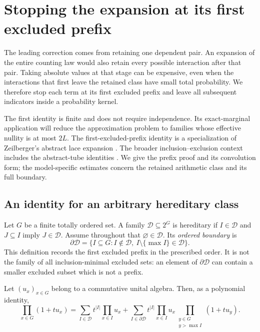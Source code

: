 \section{Stopping the expansion at its first excluded prefix}
\label{p1:stop:section}

The leading correction comes from retaining one dependent pair.
An expansion of the entire counting law would also retain every
possible interaction after that pair.  Taking absolute values at
that stage can be expensive, even when the interactions that first
leave the retained class have small total probability.  We therefore
stop each term at its first excluded prefix and leave all subsequent
indicators inside a probability kernel.

The first identity is finite and does not require independence.
Its exact-marginal application will reduce the approximation problem to
families whose effective nullity is at most $2L$.
The first-excluded-prefix identity is a specialization of
Zeilberger's abstract lace expansion
\cite[formula~(*)]{zeilberger1997}. The broader inclusion--exclusion
context includes the abstract-tube identities
\cite{naimanwynn1997,dohmen1999}. We give the prefix proof and its
convolution form; the model-specific estimates concern the retained
arithmetic class and its full boundary.

\subsection{An identity for an arbitrary hereditary class}

Let $G$ be a finite totally ordered set.  A family
$\mathscr D\subseteq 2^G$ is hereditary if $I\in\mathscr D$ and
$J\subseteq I$ imply $J\in\mathscr D$.  Assume throughout that
$\varnothing\in\mathscr D$.  Its \emph{ordered boundary} is
\begin{equation}
 \partial\mathscr D
 =\{I\subseteq G:I\notin\mathscr D,\ 
           I\setminus\{\max I\}\in\mathscr D\}.
 \label{p1:stop:boundary}
\end{equation}
This definition records the first excluded prefix in the prescribed
order.  It is not the family of all inclusion-minimal excluded sets:
an element of $\partial\mathscr D$ can contain a smaller excluded
subset which is not a prefix.

\begin{lemma}
\label{p1:stop:polynomial}
Let $(u_x)_{x\in G}$ belong to a commutative unital algebra.
Then, as a polynomial identity,
\begin{equation}
 \prod_{x\in G}(1+t u_x)
 =\sum_{I\in\mathscr D}t^{|I|}\prod_{x\in I}u_x
  +\sum_{I\in\partial\mathscr D}
       t^{|I|}\prod_{x\in I}u_x
       \prod_{\substack{y\in G\\y>\max I}}(1+t u_y).
 \label{p1:stop:polynomial-identity}
\end{equation}
\end{lemma}

